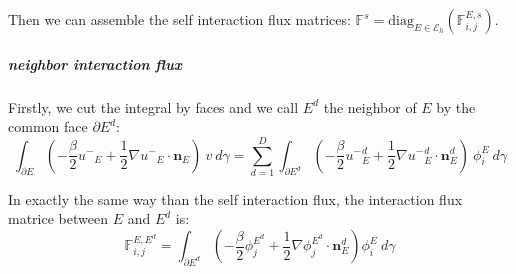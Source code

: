 \documentclass[a4paper,10pt,draft]{article}
\begin{document}
Then we can assemble the self interaction flux matrices: $\mathbb{F}^s = {\mathrm{diag}}_{E 
\in \mathcal{E}_h} (\mathbb{F}_{i,j}^{E,s})$.

\subparagraph{neighbor interaction flux}
Firstly, we cut the integral by faces and we call $E^d$ the neighbor of $E$ by the common face 
$\partial E^d$:
\begin{equation*}
 \int_{\partial E} \left( -\frac{\beta}{2} {u^-}_E + \frac{1}{2} \nabla {u^-}_E \cdot \mathbf{n}_E 
\right) \ v\ d\gamma = \sum_{d=1}^D \int_{\partial E^d} \left( -\frac{\beta}{2} {u^-}_E^d + 
\frac{1}{2} \nabla {u^-}_E^d \cdot \mathbf{n}_E^d \right) \ \phi_i^E\ d\gamma
\end{equation*}

In exactly the same way than the self interaction flux, the interaction flux matrice between $E$ 
and $E^d$ is:
\begin{equation*}
 \mathbb{F}_{i,j}^{E,E^d} = \int_{\partial E^d} \left( -\frac{\beta}{2} \phi_j^{E^d} + \frac{1}{2} 
\nabla \phi_j^{E^d} \cdot \mathbf{n}_E^d \right) \phi_i^E \ d \gamma
\end{equation*}
\end{document}
